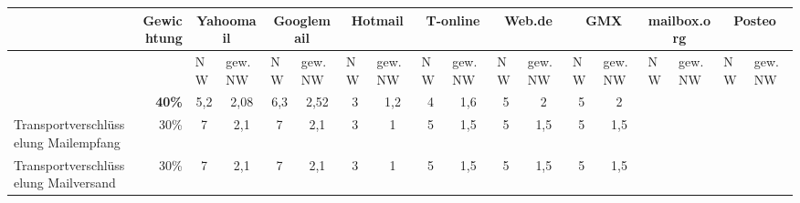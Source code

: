 \thispagestyle{empty}
\begin{landscape}
	\begin{table}
		\small
		\centering
		\renewcommand{\tabularxcolumn}[1]{>{\small}m{#1}}
		\begin{tabularx}{1.62\textwidth}{
		|>{\raggedleft\arraybackslash} p{} %
		|r %
		|X %
		|X %
		|X %
		|X %
		|X %
		|X %
		|X %
		|X %
		|X %
		|X %
		|X %
		|X %
		|X %
		|X %
		|X %
		|X %
		|} 	
		\hline 
		\multicolumn{1}{|l|}{\textbf{Kriterien}}&
		\textbf{Gewichtung}&
		\multicolumn{2}{c|}{Yahoomail}&
		\multicolumn{2}{c|}{Googlemail}&
		\multicolumn{2}{c|}{Hotmail}&
		\multicolumn{2}{c|}{T-online}&
		\multicolumn{2}{c|}{Web.de}&
		\multicolumn{2}{c|}{GMX}&
		\multicolumn{2}{c|}{mailbox.org}&
		\multicolumn{2}{c|}{Posteo}
		\\
		
		\hline 
		&
		&
		NW&
		gew. NW&
		NW&
		gew. NW&
		NW&
		gew. NW&
		NW&
		gew. NW&
		NW&
		gew. NW&
		NW&
		gew. NW&
		NW&
		gew. NW&
		NW&
		gew. NW
		\\
		
		\rowcolor{dunkelgrau}
		\hline 
		\multicolumn{1}{|l|}{\textbf{Vertraulichkeit \& Integrität}}&
		\textbf{40\%}&
		\multicolumn{1}{c|}{5,2}&
		\multicolumn{1}{c|}{2,08}&
		\multicolumn{1}{c|}{6,3}&
		\multicolumn{1}{c|}{2,52}&
		\multicolumn{1}{c|}{3}&
		\multicolumn{1}{c|}{1,2}&
		\multicolumn{1}{c|}{4}&
		\multicolumn{1}{c|}{1,6}&
		\multicolumn{1}{c|}{5}&
		\multicolumn{1}{c|}{2}&
		\multicolumn{1}{c|}{5}&
		\multicolumn{1}{c|}{2}&
		&
		&
		&
		
		\\

		\hline
		Transportverschlüsselung Mailempfang&
		30\%&
		\multicolumn{1}{c|}{7}&
		\multicolumn{1}{c|}{2,1}&
		\multicolumn{1}{c|}{7}&
		\multicolumn{1}{c|}{2,1}&
		\multicolumn{1}{c|}{3}&
		\multicolumn{1}{c|}{1}&
		\multicolumn{1}{c|}{5}&
		\multicolumn{1}{c|}{1,5}&
		\multicolumn{1}{c|}{5}&
		\multicolumn{1}{c|}{1,5}&
		\multicolumn{1}{c|}{5}&
		\multicolumn{1}{c|}{1,5}&
		&
		&
		&
		
		\\

		\hline
		Transportverschlüsselung Mailversand&
		30\%&
		\multicolumn{1}{c|}{7}&
		\multicolumn{1}{c|}{2,1}&
		\multicolumn{1}{c|}{7}&
		\multicolumn{1}{c|}{2,1}&
		\multicolumn{1}{c|}{3}&
		\multicolumn{1}{c|}{1}&
		\multicolumn{1}{c|}{5}&
		\multicolumn{1}{c|}{1,5}&
		\multicolumn{1}{c|}{5}&
		\multicolumn{1}{c|}{1,5}&
		\multicolumn{1}{c|}{5}&
		\multicolumn{1}{c|}{1,5}&
		&
		&
		&
		

\end{tabularx}
\end{table}
\end{landscape}
